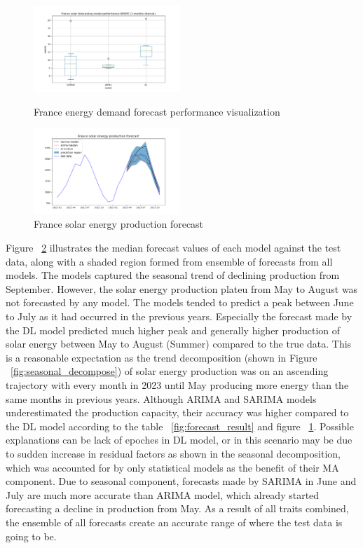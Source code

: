 \documentclass[acmtog]{acmart}
\begin{document}
\begin{figure}[htb!]
    \centering
    \includegraphics[width=0.49\textwidth, height=4cm]{figures/Figure_3.png}
    \caption{France energy demand forecast performance visualization}
    \label{fig:demand_performance_forecast} %
\end{figure}

\begin{figure}[htb!]
    \centering
    \includegraphics[width=0.49\textwidth]{figures/Figure_1.png}
    \caption{France solar energy production forecast}
    \label{fig:solar_forecast} %
\end{figure}

Figure ~\ref{fig:solar_forecast} illustrates the median forecast values of each model against the test data, along with a shaded region formed from ensemble of forecasts from all models. The models captured the seasonal trend of declining production from September. However, the solar energy production plateu from May to August was not forecasted by any model. The models tended to predict a peak between June to July as it had occurred in the previous years. Especially the forecast made by the DL model predicted much higher peak and generally higher production of solar energy between May to August (Summer) compared to the true data. This is a reasonable expectation as the trend decomposition (shown in Figure ~\ref{fig:seasonal_decompose}) of solar energy production was on an ascending trajectory with every month in 2023 until May producing more energy than the same months in previous years. Although ARIMA and SARIMA models underestimated the production capacity, their accuracy was higher compared to the DL model according to the table ~\ref{fig:forecast_result} and figure ~\ref{fig:demand_performance_forecast}. Possible explanations can be lack of epoches in DL model, or in this scenario may be due to sudden increase in residual factors as shown in the seasonal decomposition, which was accounted for by only statistical models as the benefit of their MA component. Due to seasonal component, forecasts made by SARIMA in June and July are much more accurate than ARIMA model, which already started forecasting a decline in production from May. As a result of all traits combined, the ensemble of all forecasts create an accurate range of where the test data is going to be.
\end{document}
